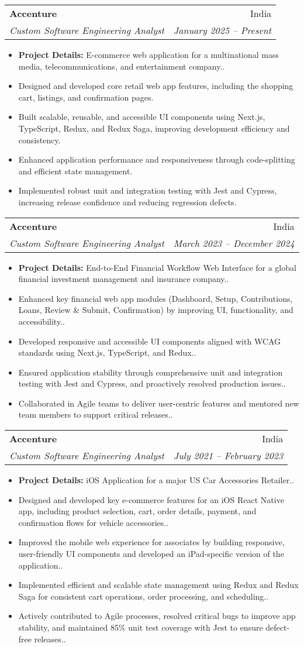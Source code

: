 \documentclass[letterpaper,11pt]{article}
\makeatletter
\newcommand{\resumeItem}[2]{
	\item\small{
		\textbf{#1}{ #2. \vspace{-2pt}}
	}
}
\newcommand{\resumeSubheading}[4]{
	\vspace{-1pt}\item
	\begin{tabular*}{0.97\textwidth}[t]{l@{\extracolsep{\fill}}r}
		\textbf{#1} & #2 \\
		\textit{\small#3} & \textit{\small #4} \\
	\end{tabular*}\vspace{-5pt}
}
\newcommand{\resumeItemListStart}{\begin{itemize}}
\newcommand{\resumeItemListEnd}{\end{itemize}\vspace{-5pt}}
\makeatother
\begin{document}
\resumeSubheading
{Accenture}{India}
{Custom Software Engineering Analyst}{January 2025 -- Present}
\resumeItemListStart
\resumeItem{\textbf{Project Details:}}{E-commerce web application for a multinational mass media, telecommunications, and entertainment company.}
\resumeItem{}{Designed and developed core retail web app features, including the shopping cart, listings, and confirmation pages}
\resumeItem{}{Built scalable, reusable, and accessible UI components using Next.js, TypeScript, Redux, and Redux Saga, improving development efficiency and consistency}
\resumeItem{}{Enhanced application performance and responsiveness through code-splitting and efficient state management}
\resumeItem{}{Implemented robust unit and integration testing with Jest and Cypress, increasing release confidence and reducing regression defects}
\resumeItemListEnd
	
\resumeSubheading
{Accenture}{India}
{Custom Software Engineering Analyst}{March 2023 -- December 2024}
\resumeItemListStart
\resumeItem{\textbf{Project Details:}}{End-to-End Financial Workflow Web Interface for a global financial investment management and insurance company.}
\resumeItem{}{Enhanced key financial web app modules (Dashboard, Setup, Contributions, Loans, Review \& Submit, Confirmation) by improving UI, functionality, and accessibility.}
\resumeItem{}{Developed responsive and accessible UI components aligned with WCAG standards using Next.js, TypeScript, and Redux.}
\resumeItem{}{Ensured application stability through comprehensive unit and integration testing with Jest and Cypress, and proactively resolved production issues.}
\resumeItem{}{Collaborated in Agile teams to deliver user-centric features and mentored new team members to support critical releases.}
\resumeItemListEnd
	
\resumeSubheading
{Accenture}{India}
{Custom Software Engineering Analyst}{July 2021 -- February 2023}
\resumeItemListStart
\resumeItem{\textbf{Project Details:}}{iOS Application for a major US Car Accessories Retailer.}
\resumeItem{}{Designed and developed key e-commerce features for an iOS React Native app, including product selection, cart, order details, payment, and confirmation flows for vehicle accessories.}
\resumeItem{}{Improved the mobile web experience for associates by building responsive, user-friendly UI components and developed an iPad-specific version of the application.}
\resumeItem{}{Implemented efficient and scalable state management using Redux and Redux Saga for consistent cart operations, order processing, and scheduling.}
\resumeItem{}{Actively contributed to Agile processes, resolved critical bugs to improve app stability, and maintained 85\% unit test coverage with Jest to ensure defect-free releases.}
\resumeItemListEnd
	
\end{document}
